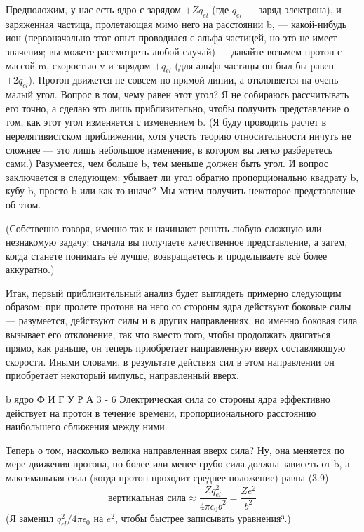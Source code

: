 \documentclass[10pt,oneside]{article}
\newcommand{\TipsRunning}[1]{\par\vspace{2bp}{\centering\footnotesize #1\par}\vspace{2bp}}
\begin{document}
Предположим, у нас есть ядро с зарядом \(+Zq_{el}\) (где \(q_{el}\) --- заряд электрона), и заряженная частица, пролетающая мимо него на расстоянии b, --- какой-нибудь ион (первоначально этот опыт проводился с альфа-частицей, но это не имеет значения; вы можете рассмотреть любой случай) --- давайте возьмем протон с массой m, скоростью v и зарядом \(+q_{el}\) (для альфа-частицы он был бы равен \(+2q_{el}\)). Протон движется не совсем по прямой линии, а отклоняется на очень малый угол. Вопрос в том, чему равен этот угол? Я не собираюсь рассчитывать его точно, а сделаю это лишь приблизительно, чтобы получить представление о том, как этот угол изменяется с изменением b. (Я буду проводить расчет в нерелятивистском приближении, хотя учесть теорию относительности ничуть не сложнее --- это лишь небольшое изменение, в котором вы легко разберетесь сами.) Разумеется, чем больше b, тем меньше должен быть угол. И вопрос заключается в следующем: убывает ли угол обратно пропорционально квадрату b, кубу b, просто b или как-то иначе? Мы хотим получить некоторое представление об этом.\par

(Собственно говоря, именно так и начинают решать любую сложную или незнакомую задачу: сначала вы получаете качественное представление, а затем, когда станете понимать её лучше, возвращаетесь и проделываете всё более аккуратно.)\par

Итак, первый приблизительный анализ будет выглядеть примерно следующим образом: при пролете протона на него со стороны ядра действуют боковые силы --- разумеется, действуют силы и в других направлениях, но именно боковая сила вызывает его отклонение, так что вместо того, чтобы продолжать двигаться прямо, как раньше, он теперь приобретает направленную вверх составляющую скорости. Иными словами, в результате действия сил в этом направлении он приобретает некоторый импульс, направленный вверх.\par

\TipsRunning{З А Д А Ч И  И  И Х  Р Е Ш Е Н И Я • 9 7}

b ядро Ф И Г У Р А  3 - 6 Электрическая сила со стороны ядра эффективно действует на протон в течение времени, пропорционального расстоянию наибольшего сближения между ними.\par

Теперь о том, насколько велика направленная вверх сила? Ну, она меняется по мере движения протона, но более или менее грубо сила должна зависеть от b, а максимальная сила (когда протон проходит среднее положение) равна (3.9) \[\text{вертикальная сила} \approx \frac{Zq_{el}^2}{4\pi\epsilon_0 b^2} = \frac{Ze^2}{b^2}\] (Я заменил \(q_{el}^2 / 4\pi\epsilon_0\) на \(e^2\), чтобы быстрее записывать уравнения³.)\par
\end{document}
